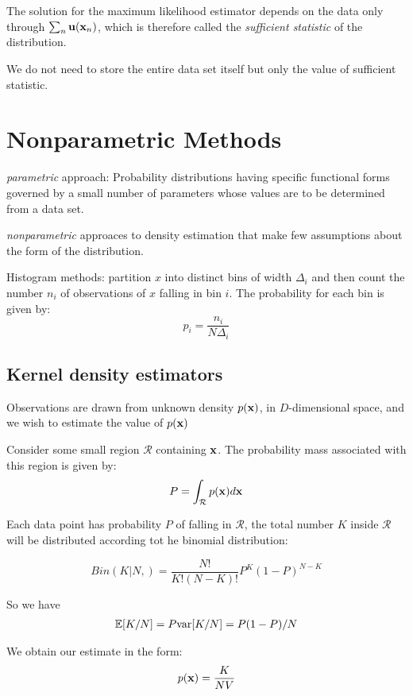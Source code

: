 The solution for the maximum likelihood estimator depends on the data only
through $\sum_n \mathbf{u}(\mathbf{x}_n)$, which is therefore called the
\emph{sufficient statistic} of the distribution.

We do not need to store the entire data set itself but only the value of
sufficient statistic.

\section{Nonparametric Methods}
\emph{parametric} approach: Probability distributions having specific
functional forms governed by a small number of parameters whose values are
to be determined from a data set.

\emph{nonparametric} approaces to density estimation that make few
assumptions about the form of the distribution. 

Histogram methods: partition $x$ into distinct bins of width $\Delta_i$
and then count the number $n_i$ of observations of $x$ falling in bin
$i$. The probability for each bin is given by:
\begin{equation}
    p_i = \frac{n_i}{N\Delta_i}
\end{equation}


\subsection{Kernel density estimators}
Observations are drawn from unknown density $p(\mathbf{x})$, in $D$-dimensional
space, and we wish to estimate the value of $p(\mathbf{x})$

Consider some small region $\mathcal{R}$ containing $\mathbf{x}$. The probability
mass associated with this region is given by:
\begin{equation}
    P = \int_{\mathcal{R}} p(\mathbf{x}) d\mathbf{x}
\end{equation}

Each data point has probability $P$ of falling in $\mathcal{R}$, the
total number $K$ inside $\mathcal{R}$ will be distributed according tot he
binomial distribution:

\begin{equation}
    Bin(K|N,) = \frac{N!}{K!(N-K)!} P^K{(1-P)}^{N-K}
\end{equation}

So we have 
\begin{align*}
    \mathbb{E}[K/N] = P
    \mbox{var}[K/N] = P(1-P)/N
\end{align*}

We obtain our estimate in the form:
\begin{equation}
    p(\mathbf{x}) = \frac{K}{NV}
\end{equation}

